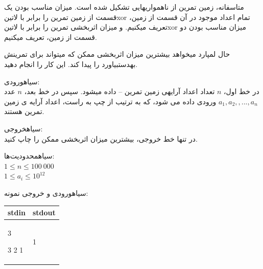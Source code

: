 متاسفانه، زمین تمرین از ناهمواریهایی تشکیل شده است. میزان مناسب بودن یک قسمت از زمین تمرین را برابر با ‌لاتین{xor}
تمام اعداد موجود در آن قسمت از زمین، تعریف میکنیم. و میزان اثربخشی تمرین را برابر با ‌لاتین{xor} میزان مناسب بودن دو قسمت از زمین، تعریف میکنیم.

حال لمپارد میخواهد بیشترین میزان اثربخشی ممکن که میتواند برای تمرینش بهدستبیاورد را پیدا کند. این کار را انجام دهید.

‌سیاه{ورودی:}\\
در خط اول، $n$ تعداد اعداد آرایهی زمین تمرین – داده میشود.
سپس در خط بعد، $n$ عدد $a_1, a_2, , ... ,a_n$ ورودی داده می شود، که به ترتیب از چپ به راست، اعداد آرایه ی زمین تمرین
هستند.

‌سیاه{خروجی:}\\
در تنها خط خروجی، بیشترین میزان اثربخشی ممکن را چاپ کنید.

‌سیاه{محدودیت‌ها:}\\
$1 \leq n \leq 100\ 000$ \\
$1 \leq a_i \leq 10^{12}$





‌سیاه{ورودی و خروجی نمونه:}\\


\begin{latin}
	\begin{tabularx}{\textwidth}{|X | X|}
		\hline
		\textbf{stdin} &
		\textbf{stdout}\\
		\hline
		3
		
		3 2 1
		
		&
		1
		\\
		\hline
		
	\end{tabularx}
\end{latin}







